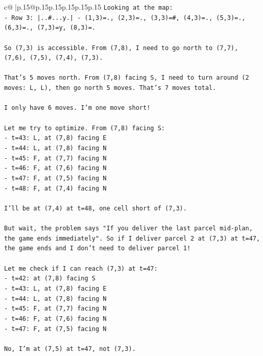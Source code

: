 \documentclass{article}
\begin{document}
{\begin{supertabular}{c@{$\;$}|p{.15\linewidth}@{}p{.15\linewidth}p{.15\linewidth}p{.15\linewidth}p{.15\linewidth}p{.15\linewidth}}
{{{\texttt{Looking at the map:} \\
\texttt{{-} Row 3: |..\#...y.| {-} (1,3)=., (2,3)=., (3,3)=\#, (4,3)=., (5,3)=., (6,3)=., (7,3)=y, (8,3)=.} \\
\\ 
\texttt{So (7,3) is accessible. From (7,8), I need to go north to (7,7), (7,6), (7,5), (7,4), (7,3).} \\
\\ 
\texttt{That's 5 moves north. From (7,8) facing S, I need to turn around (2 moves: L, L), then go north 5 moves. That's 7 moves total.} \\
\\ 
\texttt{I only have 6 moves. I'm one move short!} \\
\\ 
\texttt{Let me try to optimize. From (7,8) facing S:} \\
\texttt{{-} t=43: L, at (7,8) facing E} \\
\texttt{{-} t=44: L, at (7,8) facing N} \\
\texttt{{-} t=45: F, at (7,7) facing N} \\
\texttt{{-} t=46: F, at (7,6) facing N} \\
\texttt{{-} t=47: F, at (7,5) facing N} \\
\texttt{{-} t=48: F, at (7,4) facing N} \\
\\ 
\texttt{I'll be at (7,4) at t=48, one cell short of (7,3).} \\
\\ 
\texttt{But wait, the problem says "If you deliver the last parcel mid{-}plan, the game ends immediately". So if I deliver parcel 2 at (7,3) at t=47, the game ends and I don't need to deliver parcel 1!} \\
\\ 
\texttt{Let me check if I can reach (7,3) at t=47:} \\
\texttt{{-} t=42: at (7,8) facing S} \\
\texttt{{-} t=43: L, at (7,8) facing E} \\
\texttt{{-} t=44: L, at (7,8) facing N} \\
\texttt{{-} t=45: F, at (7,7) facing N} \\
\texttt{{-} t=46: F, at (7,6) facing N} \\
\texttt{{-} t=47: F, at (7,5) facing N} \\
\\ 
\texttt{No, I'm at (7,5) at t=47, not (7,3).} \\
}}}
\end{supertabular}}
\end{document}
